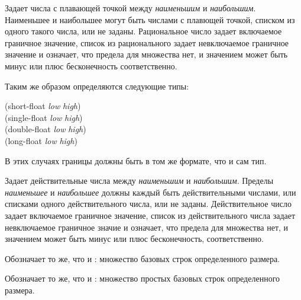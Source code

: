 \begin{flushdesc}
\item[\cd{(float \emph{наименьшее} \emph{наибольшее})}]
Задает числа с плавающей точкой  между \emph{наименьшим} и
\emph{наибольшим}. Наименьшее и наибольшее могут быть числами с плавющей точкой, списком
из одного такого числа, или не заданы.
Рациональное число задает включаемое граничное значение, список из
рационального задает невключаемое граничное значение и \cdf{*} означает, что
предела для множества нет, и значением может быть минус или плюс бесконечность
соответственно.

Таким же образом определяются следующие типы:
\begin{lisp}
(short-float \emph{low} \emph{high}) \\
(single-float \emph{low} \emph{high}) \\
(double-float \emph{low} \emph{high}) \\
(long-float \emph{low} \emph{high})
\end{lisp}
В этих случаях границы должны быть в том же формате, что и сам тип.
\end{flushdesc}

\begin{newer}
\begin{flushdesc}
\item[\cd{(real \emph{наименьшее} \emph{наибольшее})}]
Задает действительные числа между \emph{наименьшим} и \emph{наибольшим}. Пределы
\emph{наименьшее} и \emph{наибольшее} должны каждый быть действительными числами, или
списками одного действительного числа, или не заданы.
Действительное число задает включаемое граничное значение, список из
действительного числа задает невключаемое граничное значие и \cdf{*} означает,
что предела для множества нет, и значением может быть минус или плюс
бесконечность, соответственно.
\end{flushdesc}
\end{newer}

\begin{newer}
\begin{flushdesc}
\item[\cd{(base-string \emph{размер})}]
Обозначает то же, что и : множество
базовых строк определенного размера.

\item[\cd{(simple-base-string \emph{размер})}]
Обозначает то же, что и : множество
простых базовых строк определенного размера.
\end{flushdesc}
\end{newer}

